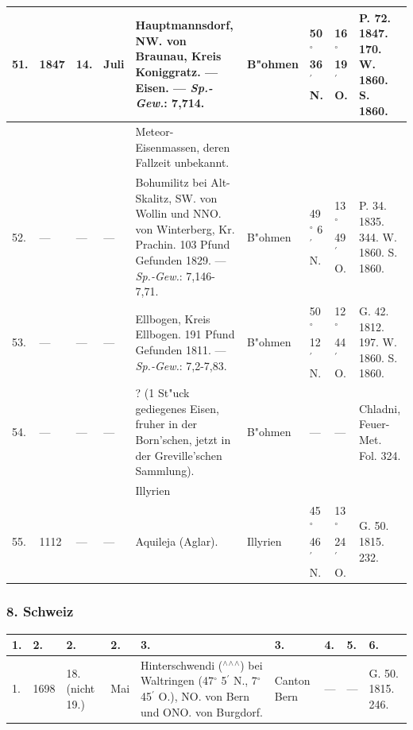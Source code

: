 \documentclass[a4paper, 8pt, oneside, polutonikogreek, german]{article}
\begin{document}
\begin{center}
\begin{longtable}{|p{3mm}|p{13mm}|p{5mm}|p{16mm}|p{25mm}|p{13mm}|p{13mm}|p{13mm}|p{13mm}|}
        51. & 1847 & 14. & Juli & Hauptmannsdorf, NW. von Braunau, Kreis Koniggratz. --- Eisen. --- \emph{Sp.-Gew.}: 7,714. & B"ohmen & 50$^\circ$ 36$^\prime$ N. & 16$^\circ$ 19$^\prime$ O. & P. 72. 1847. 170. W. 1860. S. 1860. \\ \hline
          &   &   &   & Meteor-Eisenmassen, deren Fallzeit unbekannt. &   &   &   & ~ \\ \hline
        52. & --- & --- & --- & Bohumilitz bei Alt-Skalitz, SW. von Wollin und NNO. von Winterberg, Kr. Prachin. 103 Pfund Gefunden 1829. --- \emph{Sp.-Gew.}: 7,146-7,71. & B"ohmen & 49$^\circ$ 6$^\prime$ N. & 13$^\circ$ 49$^\prime$ O. & P. 34. 1835. 344. W. 1860. S. 1860. \\ \hline
        53. & --- & --- & --- & Ellbogen, Kreis Ellbogen. 191 Pfund Gefunden 1811. --- \emph{Sp.-Gew.}: 7,2-7,83. & B"ohmen & 50$^\circ$ 12$^\prime$ N. & 12$^\circ$ 44$^\prime$ O. & G. 42. 1812. 197. W. 1860. S. 1860. \\ \hline
        54. & --- & --- & --- & ? (1 St"uck gediegenes Eisen, fruher in der Born’schen, jetzt in der Greville’schen Sammlung). & B"ohmen & --- & --- & Chladni, Feuer-Met. Fol. 324. \\ \hline
         &   &   &  & Illyrien &   &   &   &   \\ \hline
        55. & 1112 & --- & --- & Aquileja (Aglar). & Illyrien & 45$^\circ$ 46$^\prime$ N. & 13$^\circ$ 24$^\prime$ O. & G. 50. 1815. 232. \\ \hline
    \end{longtable}
\end{center}
\subsubsection{8. Schweiz}
\begin{table}[H]
    \footnotesize
    \begin{longtable}{|p{3mm}|p{13mm}|p{5mm}|p{16mm}|p{25mm}|p{16mm}|p{13mm}|p{13mm}|p{13mm}|}
    \hline
        1. & 2. & 2. & 2. & 3. & 3. & 4. & 5. & 6. \\ \hline
        1. & 1698 & 18. (nicht 19.) & Mai & Hinterschwendi ($^\wedge$$^\wedge$$^\wedge$) bei Waltringen (47$^\circ$ 5$^\prime$ N., 7$^\circ$ 45$^\prime$ O.), NO. von Bern und ONO. von Burgdorf. & Canton Bern & --- & --- & G. 50. 1815. 246. \\ \hline
    \end{longtable}
\end{table}
\end{document}
